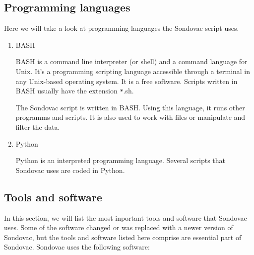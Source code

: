\subsection{Programming languages}
Here we will take a look at programming languages the Sondovac script uses. 

\begin{enumerate}
\item BASH

BASH is a command line interpreter (or shell) and a command language for Unix. It's a programming scripting language accessible through a terminal in 
any Unix-based operating system. It is a free software. Scripts written in BASH usually have the extension \verb_*_.sh. 

The Sondovac script is written in BASH. Using this language, it runs other programms and scripts. It is also used to work with files or manipulate and filter the data. 

\item Python

Python is an interpreted programming language. 
Several scripts that Sondovac uses are coded in Python. 

\end{enumerate}

\subsection{Tools and software}

In this section, we will list the most inportant tools and software that Sondovac uses. Some of the software changed or was replaced with a newer version of Sondovac, 
but the tools and software listed here comprise are essential part of Sondovac. 
Sondovac uses the following software: 

